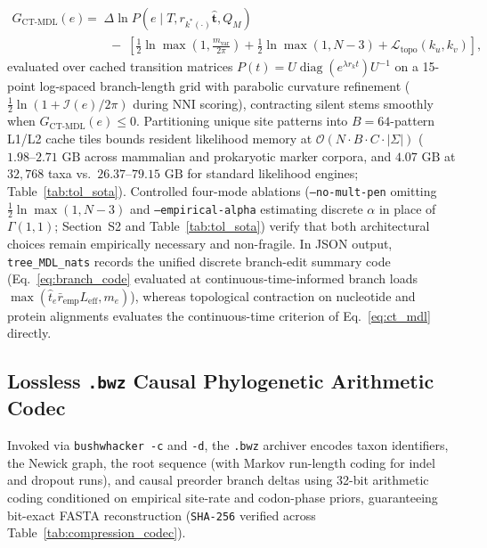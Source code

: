 \documentclass[12pt]{article}
\begin{document}
\begin{itemize}
    \begin{equation}
        \begin{aligned}
            G_{\text{CT-MDL}}(e) &\;=\; \Delta\ln P(e \mid T, r_{k^*(\cdot)}\hat{\mathbf{t}}, Q_M) \\
            &\qquad \;-\; \left[ \frac{1}{2}\ln\max\!\left(1,\frac{m_{\text{var}}}{2\pi}\right) + \frac{1}{2}\ln\max(1, N-3) + \mathcal{L}_{\text{topo}}(k_u, k_v) \right],
        \end{aligned}
        \label{eq:ct_mdl}
    \end{equation}
    evaluated over cached transition matrices $P(t) = U\operatorname{diag}(e^{\lambda r_k t})U^{-1}$ on a 15-point log-spaced branch-length grid with parabolic curvature refinement ($\frac{1}{2}\ln(1 + \mathcal{I}(e)/2\pi)$ during NNI scoring), contracting silent stems smoothly when $G_{\text{CT-MDL}}(e) \le 0$. Partitioning unique site patterns into $B = 64$-pattern L1/L2 cache tiles bounds resident likelihood memory at $\mathcal{O}(N \cdot B \cdot C \cdot |\Sigma|)$ ($1.98\text{--}2.71\text{ GB}$ across mammalian and prokaryotic marker corpora, and $4.07\text{ GB}$ at $32,768$ taxa vs.\ $26.37\text{--}79.15\text{ GB}$ for standard likelihood engines; Table~\ref{tab:tol_sota}). Controlled four-mode ablations (\texttt{--no-mult-pen} omitting $\frac{1}{2}\ln\max(1, N-3)$ and \texttt{--empirical-alpha} estimating discrete $\alpha$ in place of $\Gamma(1,1)$; Section~S2 and Table~\ref{tab:tol_sota}) verify that both architectural choices remain empirically necessary and non-fragile. In JSON output, \texttt{tree\_MDL\_nats} records the unified discrete branch-edit summary code (Eq.~\eqref{eq:branch_code} evaluated at continuous-time-informed branch loads $\max(\hat{t}_e \bar{r}_{\text{emp}} L_{\text{eff}}, m_e)$), whereas topological contraction on nucleotide and protein alignments evaluates the continuous-time criterion of Eq.~\eqref{eq:ct_mdl} directly.
\end{itemize}

\subsection*{Lossless \texttt{.bwz} Causal Phylogenetic Arithmetic Codec}

Invoked via \texttt{bushwhacker -c} and \texttt{-d}, the \texttt{.bwz} archiver encodes taxon identifiers, the Newick graph, the root sequence (with Markov run-length coding for indel and dropout runs), and causal preorder branch deltas using 32-bit arithmetic coding \cite{witten1987arithmetic} conditioned on empirical site-rate and codon-phase priors, guaranteeing bit-exact FASTA reconstruction (\texttt{SHA-256} verified across Table~\ref{tab:compression_codec}).
\end{document}
